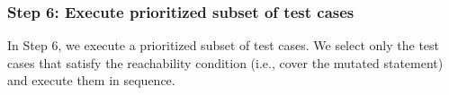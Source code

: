 {\subsubsection{Step 6: Execute prioritized subset of test cases}
\label{sec:step:prioritize}
%
In Step 6, we execute a prioritized subset of test cases.
We select only the test cases that satisfy
the reachability condition (i.e., cover the mutated statement) and  execute them in sequence.
%
%
}
